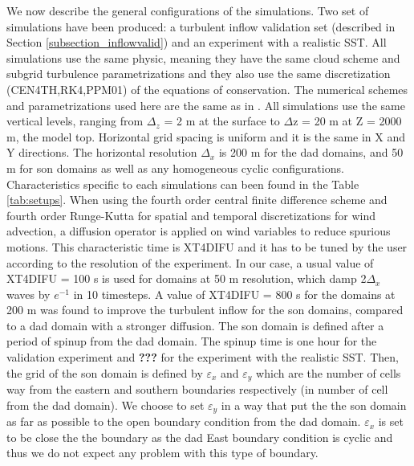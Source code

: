 \documentclass[draft]{agujournal2019} %
\begin{document}
            We now describe the general configurations of the simulations. Two set of simulations have been produced: a turbulent inflow validation set (described in Section \ref{subsection_inflowvalid}) and an experiment with a realistic SST. All simulations use the same physic, meaning they have the same cloud scheme and subgrid turbulence parametrizations and they also use the same discretization (CEN4TH,RK4,PPM01) of the equations of conservation. The numerical schemes and parametrizations used here are the same as in . All simulations use the same vertical levels, ranging from $\Delta_z$ = 2 m at the surface to $\Delta$z = 20 m at Z = 2000 m, the model top. Horizontal grid spacing is uniform and it is the same in X and Y directions. The horizontal resolution $\Delta_{x}$ is 200 m for the dad domains, and 50 m for son domains as well as any homogeneous cyclic configurations. Characteristics specific to each simulations can been found in the Table \ref{tab:setups}. When using the fourth order central finite difference scheme and fourth order Runge-Kutta for spatial and temporal discretizations for wind advection, a diffusion operator is applied on wind variables to reduce spurious motions. This characteristic time is XT4DIFU and it has to be tuned by the user according to the resolution of the experiment. In our case, a usual value of XT4DIFU = 100 s is used for domains at 50 m resolution, which damp 2$\Delta_x$ waves by $e^{-1}$ in 10 timesteps. A value of XT4DIFU = 800 s for the domains at 200 m was found to improve the turbulent inflow for the son domains, compared to a dad domain with a stronger diffusion. The son domain is defined after a period of spinup from the dad domain. The spinup time is one hour for the validation experiment and \textbf{???} for the experiment with the realistic SST. Then, the grid of the son domain is defined by $\varepsilon_x$ and $\varepsilon_y$ which are the number of cells way from the eastern and southern boundaries respectively (in number of cell from the dad domain). We choose to set $\varepsilon_y$ in a way that put the the son domain as far as possible to the open boundary condition from the dad domain.  $\varepsilon_x$ is set to be close the the boundary as the dad East boundary condition is cyclic and thus we do not expect any problem with this type of boundary. 

\end{document}
